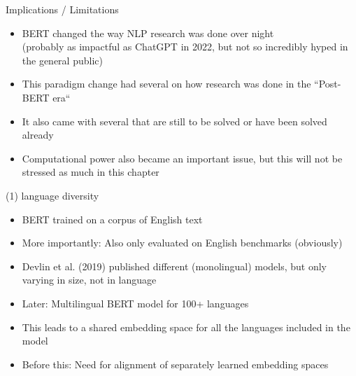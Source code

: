 \documentclass[11pt,compress,t,notes=noshow, xcolor=table]{beamer}
\begin{document}


\begin{frame}{Implications / Limitations}

\vfill

	\begin{itemize}
		\item BERT changed the way NLP research was done over night\\
					(probably as impactful as ChatGPT in 2022, but not so incredibly hyped in the general public)
		\item This paradigm change had several  on how research was done in the ``Post-BERT era``
		\item It also came with several  that are still to be solved or have been solved already
		\item Computational power also became an important issue, but this will not be stressed as much in this chapter
	\end{itemize}

\vfill

\end{frame}


\begin{frame}{(1) language diversity}

\vfill

	\begin{itemize}
		\item BERT trained on a corpus of English text
		\item More importantly: Also only evaluated on English benchmarks (obviously)
		\item Devlin et al. (2019) published different (monolingual) models, but only varying in size, not in language
		\item Later: Multilingual BERT model  for 100+ languages
		\item This leads to a shared embedding space for all the languages included in the model
		\item Before this: Need for alignment of separately learned embedding spaces
	\end{itemize}

\vfill

\end{frame}
\end{document}
